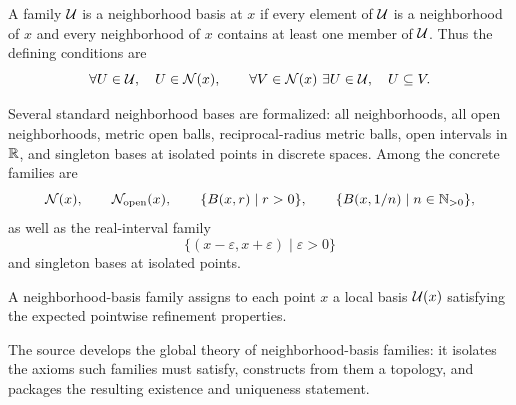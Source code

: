 \begin{definition}\label{def:neighborhood-basis-2-5}
\leanok
A family $\mathcal{U}$ is a neighborhood basis at $x$ if every element of $\mathcal{U}$ is a neighborhood of $x$ and every neighborhood of $x$ contains at least one member of $\mathcal{U}$.
Thus the defining conditions are
\[
\forall U\in\mathcal{U},\quad U\in\mathcal N(x),
\qquad
\forall V\in\mathcal N(x)\ \exists U\in\mathcal{U},\quad U\subseteq V.
\]
\end{definition}

\begin{example}\label{ex:neighborhood-bases-2-6-2-9}
\leanok
Several standard neighborhood bases are formalized: all neighborhoods, all open neighborhoods, metric open balls, reciprocal-radius metric balls, open intervals in $\mathbb{R}$, and singleton bases at isolated points in discrete spaces.
Among the concrete families are
\[
\mathcal N(x),
\qquad
\mathcal N_{\mathrm{open}}(x),
\qquad
\{B(x,r)\mid r>0\},
\qquad
\{B(x,1/n)\mid n\in\mathbb{N}_{>0}\},
\]
as well as the real-interval family
\[
\{(x-\varepsilon,x+\varepsilon)\mid \varepsilon>0\}
\]
and singleton bases at isolated points.
\end{example}

\begin{definition}\label{def:neighborhood-basis-family-2-10}
\leanok
A neighborhood-basis family assigns to each point $x$ a local basis $\mathcal{U}(x)$ satisfying the expected pointwise refinement properties.
\end{definition}

\begin{proposition}\label{prop:neighborhood-basis-family-generated-topology-2-10-2-11}
\leanok
The source develops the global theory of neighborhood-basis families: it isolates the axioms such families must satisfy, constructs from them a topology, and packages the resulting existence and uniqueness statement.
\end{proposition}

